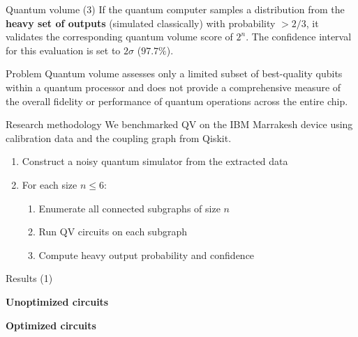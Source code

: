 \documentclass{beamer}
\begin{document}
\begin{frame}{Quantum volume (3)}
    If the quantum computer samples a distribution from the \textbf{heavy set of outputs} (simulated classically) with probability $> 2/3$, it validates the corresponding quantum volume score of $2^n$. The confidence interval for this evaluation is set to $2\sigma$ ($97.7\%$).

    \begin{alertblock}{Problem}
        Quantum volume assesses only a limited subset of best-quality qubits within a quantum processor and does not provide a comprehensive measure of the overall fidelity or performance of quantum operations across the entire chip.
    \end{alertblock}
\end{frame}


\begin{frame}{Research methodology}
    We benchmarked QV on the IBM Marrakesh device using calibration data and the coupling graph from Qiskit.

    \begin{enumerate}
        \item Construct a noisy quantum simulator from the extracted data
        \item For each size $n \leq 6$:
        \begin{enumerate}
            \item Enumerate all connected subgraphs of size $n$
            \item Run QV circuits on each subgraph
            \item Compute heavy output probability and confidence
        \end{enumerate}
    \end{enumerate}
\end{frame}

\begin{frame}{Results (1)}
    \small

    \textbf{Unoptimized circuits}
    \vspace{0.3em}

    

    \vspace{0.8em}

    \textbf{Optimized circuits}
    \vspace{0.3em}

    

    \vspace{0.5em}

\end{frame}
\end{document}
